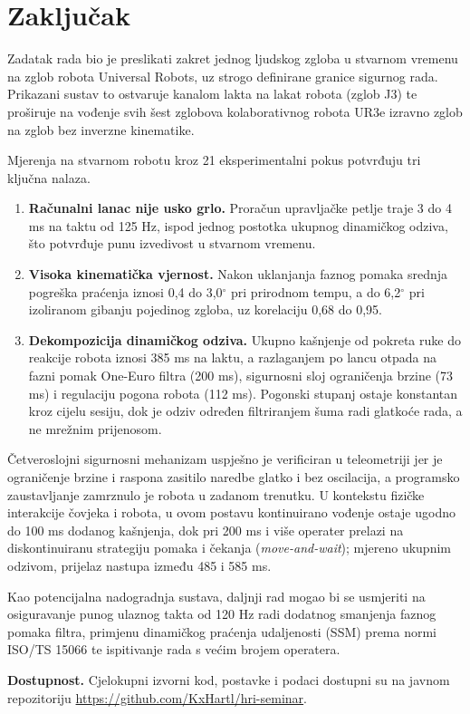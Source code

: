 \section{Zaključak}

Zadatak rada bio je preslikati zakret jednog ljudskog zgloba u stvarnom vremenu na zglob robota Universal Robots, uz strogo definirane granice sigurnog rada. Prikazani sustav to ostvaruje kanalom lakta na lakat robota (zglob J3) te proširuje na vođenje svih šest zglobova kolaborativnog robota UR3e izravno zglob na zglob bez inverzne kinematike.

Mjerenja na stvarnom robotu kroz 21 eksperimentalni pokus potvrđuju tri ključna nalaza.
\begin{enumerate}
  \item \textbf{Računalni lanac nije usko grlo.} Proračun upravljačke petlje traje 3 do 4 ms na taktu od 125 Hz, ispod jednog postotka ukupnog dinamičkog odziva, što potvrđuje punu izvedivost u stvarnom vremenu.
  \item \textbf{Visoka kinematička vjernost.} Nakon uklanjanja faznog pomaka srednja pogreška praćenja iznosi 0,4 do 3,0$^\circ$ pri prirodnom tempu, a do 6,2$^\circ$ pri izoliranom gibanju pojedinog zgloba, uz korelaciju 0,68 do 0,95.
  \item \textbf{Dekompozicija dinamičkog odziva.} Ukupno kašnjenje od pokreta ruke do reakcije robota iznosi 385 ms na laktu, a razlaganjem po lancu otpada na fazni pomak One-Euro filtra (200 ms), sigurnosni sloj ograničenja brzine (73 ms) i regulaciju pogona robota (112 ms). Pogonski stupanj ostaje konstantan kroz cijelu sesiju, dok je odziv određen filtriranjem šuma radi glatkoće rada, a ne mrežnim prijenosom.
\end{enumerate}

Četveroslojni sigurnosni mehanizam uspješno je verificiran u teleometriji jer je ograničenje brzine i raspona zasitilo naredbe glatko i bez oscilacija, a programsko zaustavljanje zamrznulo je robota u zadanom trenutku. U kontekstu fizičke interakcije čovjeka i robota, u ovom postavu kontinuirano vođenje ostaje ugodno do 100 ms dodanog kašnjenja, dok pri 200 ms i više operater prelazi na diskontinuiranu strategiju pomaka i čekanja (\emph{move-and-wait}); mjereno ukupnim odzivom, prijelaz nastupa između 485 i 585 ms.

Kao potencijalna nadogradnja sustava, daljnji rad mogao bi se usmjeriti na osiguravanje punog ulaznog takta od 120 Hz radi dodatnog smanjenja faznog pomaka filtra, primjenu dinamičkog praćenja udaljenosti (SSM) prema normi ISO/TS 15066 te ispitivanje rada s većim brojem operatera.

\vspace{0.2cm}
\noindent\small\textbf{Dostupnost.} Cjelokupni izvorni kod, postavke i podaci dostupni su na javnom repozitoriju \url{https://github.com/KxHartl/hri-seminar}.

\FloatBarrier
